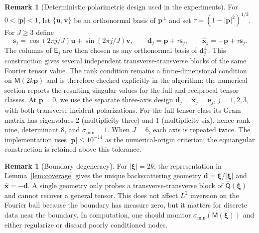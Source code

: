 \documentclass[11pt]{article}
\numberwithin{equation}{section}
\newcommand{\vect}[1]{\bm{#1}}
\newcommand{\tens}[1]{\bm{\mathsf{#1}}}
\newcommand{\Qt}{\ensuremath{\tens{Q}}}
\newcommand{\Mt}{\ensuremath{\tens{M}}}
\newcommand{\abs}[1]{\left\lvert #1\right\rvert}
\theoremstyle{plain}
\theoremstyle{definition}
\newtheorem{remark}[theorem]{Remark}
\begin{document}
\begin{remark}[Deterministic polarimetric design used in the experiments]\label{rem:deterministic_design}
For $0<\abs{\vect{p}}<1$, let $\{\vect{u},\vect{v}\}$ be an orthonormal basis of $\vect{p}^{\perp}$ and set $\tau=(1-\abs{\vect{p}}^2)^{1/2}$.  For $J\ge3$ define
\begin{equation*}
  \vect{s}_j=\cos(2\pi j/J)\vect{u}+\sin(2\pi j/J)\vect{v},\qquad
  \vect{d}_j=\vect{p}+\tau\vect{s}_j,\qquad
  \hat{\vect{x}}_j=-\vect{p}+\tau\vect{s}_j .
\end{equation*}
The columns of $\tens{E}_j$ are then chosen as any orthonormal basis of $\vect{d}_j^{\perp}$.  This construction gives several independent transverse-transverse blocks of the same Fourier tensor value.  The rank condition remains a finite-dimensional condition on $\Mt(2k\vect{p})$ and is therefore checked explicitly in the algorithm; the numerical section reports the resulting singular values for the full and reciprocal tensor classes.
At $\vect{p}=0$, we use the separate three-axis design
$\vect{d}_j=\hat{\vect{x}}_j=\vect{e}_j$, $j=1,2,3$, with both transverse incident polarizations.
For the full tensor class its Gram matrix has eigenvalues $2$ (multiplicity three) and $1$ (multiplicity six), hence rank nine, determinant $8$, and $\sigma_{\min}=1$.
When $J=6$, each axis is repeated twice.  The implementation uses $\abs{\vect{p}}\le10^{-14}$ as the numerical-origin criterion; the equiangular construction is retained above this tolerance.
\end{remark}


\begin{remark}[Boundary degeneracy]\label{rem:boundary_degeneracy}
For $\abs{\vect{\xi}}=2k$, the representation in Lemma~\ref{lem:coverage} gives the unique backscattering geometry $\vect{d}=\vect{\xi}/\abs{\vect{\xi}}$ and $\hat{\vect{x}}=-\vect{d}$.  A single geometry only probes a transverse-transverse block of $\widehat{\Qt}(\vect{\xi})$ and cannot recover a general tensor.  This does not affect $L^2$ inversion on the Fourier ball because the boundary has measure zero, but it matters for discrete data near the boundary.  In computation, one should monitor $\sigma_{\min}(\Mt(\vect{\xi}))$ and either regularize or discard poorly conditioned nodes.
\end{remark}
\end{document}
